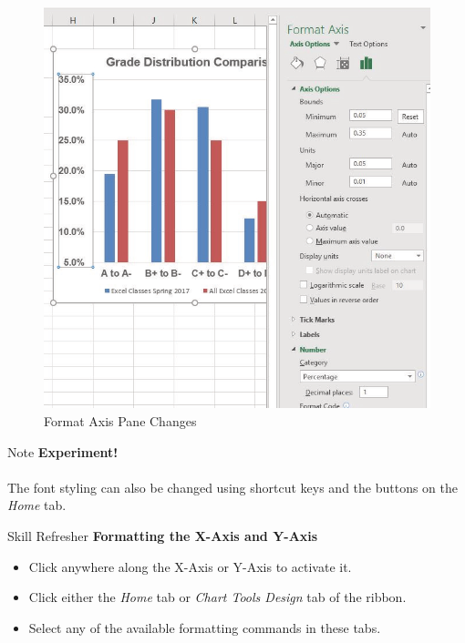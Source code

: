 \begin{figure}[H]
	\centering
	\includegraphics[width=\maxwidth{.95\linewidth}]{gfx/ch04_fig30}
	\caption{Format Axis Pane Changes}
	\label{04:fig30}
\end{figure}

\begin{center}
	\begin{infobox}{Note}
		\textbf{Experiment!}
		\\
		\\
		The font styling can also be changed using shortcut keys and the buttons on the \textit{Home} tab.
	\end{infobox}
\end{center}

\begin{center}
	\begin{sklbox}{Skill Refresher}
		\textbf{Formatting the X-Axis and Y-Axis}
		\\
		\begin{itemize}
			\setlength{\itemsep}{0pt}
			\setlength{\parskip}{0pt}
			\setlength{\parsep}{0pt}

			\item Click anywhere along the X-Axis or Y-Axis to activate it.
			\item Click either the \textit{Home} tab or \textit{Chart Tools Design} tab of the ribbon.
			\item Select any of the available formatting commands in these tabs.
			
		\end{itemize}
	\end{sklbox}
\end{center}

